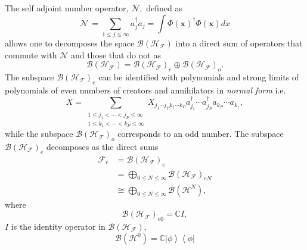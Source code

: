 \documentclass[aps,preprint]{revtex4}%
\begin{document}
The self adjoint number operator, $\mathcal{N},$ defined as
\begin{equation}
\mathcal{N\,}=\sum_{1\leq j\leq\infty}a_{j}^{\dagger}a_{j}=\int\Phi\left(
\boldsymbol{x}\right)  ^{\dagger}\Phi\left(  \boldsymbol{x}\right)  dx
\end{equation}
allows one to decomposes the space $\mathcal{B}\left(  \mathcal{H}%
_{\mathcal{F}}\right)  $ into a direct sum of operators that commute with
$\mathcal{N}$ and those that do not as
\begin{equation}
\mathcal{B}\left(  \mathcal{H}_{\mathcal{F}}\right)  =\mathcal{B}\left(
\mathcal{H}_{\mathcal{F}}\right)  _{e}\oplus\mathcal{B}\left(  \mathcal{H}%
_{\mathcal{F}}\right)  _{o}.
\end{equation}
The subspace $\mathcal{B}\left(  \mathcal{H}_{\mathcal{F}}\right)  _{e}$ can
be identified with polynomials and strong limits of polynomials of even
numbers of creators and annihilators in \emph{normal form} i.e.%
\begin{equation}
X=\sum_{\substack{1\leq j_{1}<\cdots<j_{P}\leq\infty\\1\leq k_{1}<\cdots
<k_{P}\leq\infty}}X_{j_{1}\cdots j_{P}k_{1}\cdots k_{P}}a_{j_{1}}^{\dagger
}\cdots a_{j_{P}}^{\dagger}a_{k_{P}}\cdots a_{k_{1}},
\end{equation}
while the subspace $\mathcal{B}\left(  \mathcal{H}_{\mathcal{F}}\right)  _{o}$
corresponds to an odd number. The subspace $\mathcal{B}\left(  \mathcal{H}%
_{\mathcal{F}}\right)  _{e}$ decomposes as the direct sums
\begin{align}
\mathcal{F}_{e}  &  =\mathcal{B}\left(  \mathcal{H}_{\mathcal{F}}\right)
_{e}\nonumber\\
&  =%
{\displaystyle\bigoplus\limits_{0\leq N\leq\infty}}
\mathcal{B}\left(  \mathcal{H}_{\mathcal{F}}\right)  _{eN}\label{BanSp}\\
&  \cong%
{\displaystyle\bigoplus\limits_{0\leq N\leq\infty}}
\mathcal{B}\left(  \mathcal{H}^{N}\right)  , \label{BanAlg}%
\end{align}
where
\begin{equation}
\mathcal{B}\left(  \mathcal{H}_{\mathcal{F}}\right)  _{e0}=\mathbb{C}I,
\end{equation}
$I$ is the identity operator in $\mathcal{B}\left(  \mathcal{H}_{\mathcal{F}%
}\right)  ,$%
\begin{equation}
\mathcal{B}\left(  \mathcal{H}^{0}\right)  =\mathbb{C}\left\vert
\phi\right\rangle \left\langle \phi\right\vert
\end{equation}
\end{document}
